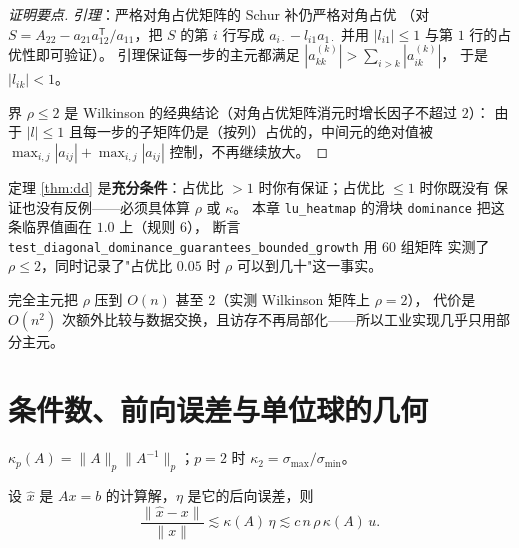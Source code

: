 \begin{proof}[证明要点]
\emph{引理}：严格对角占优矩阵的 Schur 补仍严格对角占优
（对 $S=A_{22}-a_{21}a_{12}^{\mathsf T}/a_{11}$，把 $S$ 的第 $i$ 行写成
$a_{i\cdot}-l_{i1}a_{1\cdot}$ 并用 $|l_{i1}|\le1$ 与第 $1$ 行的占优性即可验证）。
引理保证每一步的主元都满足 $|a^{(k)}_{kk}|>\sum_{i>k}|a^{(k)}_{ik}|$，
于是 $|l_{ik}|<1$。

界 $\rho\le2$ 是 Wilkinson 的经典结论（对角占优矩阵消元时增长因子不超过 $2$）：
由于 $|l|\le1$ 且每一步的子矩阵仍是（按列）占优的，中间元的绝对值被
$\max_{i,j}|a_{ij}|+\max_{i,j}|a_{ij}|$ 控制，不再继续放大。
\end{proof}

\begin{remark}[充分，不必要]
\label{rem:dd-suffic}
定理 \ref{thm:dd} 是\textbf{充分条件}：占优比 $>1$ 时你有保证；占优比 $\le1$ 时你既没有
保证也没有反例——必须具体算 $\rho$ 或 $\kappa$。
本章 \texttt{lu\_\allowbreak{}heatmap} 的滑块 \texttt{dominance} 把这条临界值画在 $1.0$ 上（规则 6），
断言 \texttt{test\_\allowbreak{}diagonal\_\allowbreak{}dominance\_\allowbreak{}guarantees\_\allowbreak{}bounded\_\allowbreak{}growth} 用 60 组矩阵
实测了 $\rho\le2$，同时记录了"占优比 $0.05$ 时 $\rho$ 可以到几十"这一事实。
\end{remark}

\begin{remark}[完全主元与代价]
完全主元把 $\rho$ 压到 $O(n)$ 甚至 $2$（实测 Wilkinson 矩阵上 $\rho=2$），
代价是 $O(n^2)$ 次额外比较与数据交换，且访存不再局部化——所以工业实现几乎只用部分主元。
\end{remark}

\section{条件数、前向误差与单位球的几何}

\begin{definition}[条件数]
$\kappa_p(A)=\|A\|_p\|A^{-1}\|_p$；$p=2$ 时 $\kappa_2=\sigma_{\max}/\sigma_{\min}$。
\end{definition}

\begin{theorem}[前向误差界]
\label{thm:forward}
设 $\hat x$ 是 $Ax=b$ 的计算解，$\eta$ 是它的后向误差，则
\begin{equation}
  \frac{\|\hat x-x\|}{\|x\|}\lesssim\kappa(A)\,\eta\lesssim c\,n\,\rho\,\kappa(A)\,u .
  \label{eq:forward}
\end{equation}
\end{theorem}

